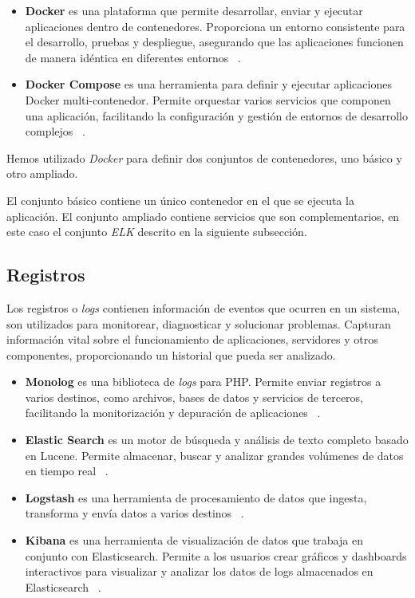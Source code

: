 \begin{itemize}
    \item \textbf{Docker} es una plataforma que permite desarrollar, enviar y ejecutar aplicaciones dentro de
    contenedores.
    Proporciona un entorno consistente para el desarrollo, pruebas y despliegue, asegurando que las aplicaciones
    funcionen de manera idéntica en diferentes entornos ~\cite{url_docker}.
    \item \textbf{Docker Compose} es una herramienta para definir y ejecutar aplicaciones Docker multi-contenedor.
    Permite orquestar varios servicios que componen una aplicación, facilitando la configuración y gestión de entornos
    de desarrollo complejos ~\cite{url_docker_compose}.
\end{itemize}

Hemos utilizado \textit{Docker} para definir dos conjuntos de contenedores, uno básico y otro ampliado.

El conjunto básico contiene un único contenedor en el que se ejecuta la aplicación.
El conjunto ampliado contiene servicios que son complementarios, en este caso el conjunto \textit{ELK} descrito en la
siguiente subsección.

\subsection{Registros}\label{subsec:chapter_4.logs}

Los registros o \textit{logs} contienen información de eventos que ocurren en un sistema, son utilizados para
monitorear, diagnosticar y solucionar problemas.
Capturan información vital sobre el funcionamiento de aplicaciones, servidores y otros componentes, proporcionando un
historial que pueda ser analizado.

\begin{itemize}
    \item \textbf{Monolog} es una biblioteca de \textit{logs} para PHP. Permite enviar registros a varios destinos, como
    archivos, bases de datos y servicios de terceros, facilitando la monitorización y depuración de aplicaciones
    ~\cite{url_monolog}.
    \item \textbf{Elastic Search} es un motor de búsqueda y análisis de texto completo basado en Lucene.
    Permite almacenar, buscar y analizar grandes volúmenes de datos en tiempo real
    ~\cite{url_elasticsearch}.
    \item \textbf{Logstash} es una herramienta de procesamiento de datos que ingesta, transforma y envía datos a varios
    destinos ~\cite{url_logstash}.
    \item \textbf{Kibana} es una herramienta de visualización de datos que trabaja en conjunto con Elasticsearch.
    Permite a los usuarios crear gráficos y dashboards interactivos para visualizar y analizar los datos de logs
    almacenados en Elasticsearch ~\cite{url_kibana}.
\end{itemize}

